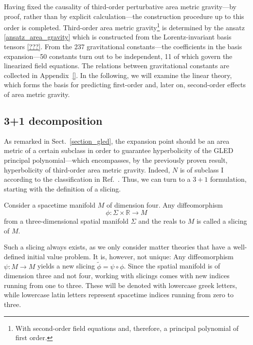 Having fixed the causality of third-order perturbative area metric gravity---by proof, rather than by explicit calculation---the construction procedure up to this order is completed. Third-order area metric gravity\footnote{With second-order field equations and, therefore, a principal polynomial of first order.} is determined by the ansatz \eqref{ansatz_area_gravity} which is constructed from the Lorentz-invariant basis tensors \eqref{???}. From the 237 gravitational constants---the coefficients in the basis expansion---50 constants turn out to be independent, 11 of which govern the linearized field equations. The relations between gravitational constants are collected in Appendix~\ref{}. In the following, we will examine the linear theory, which forms the basis for predicting first-order and, later on, second-order effects of area metric gravity.

\subsection{3+1 decomposition}
\label{sect_three_plus_one}
As remarked in Sect.~\ref{section_gled}, the expansion point should be an area metric of a certain subclass in order to guarantee hyperbolicity of the GLED principal polynomial---which encompasses, by the previously proven result, hyperbolicity of third-order area metric gravity. Indeed, $N$ is of subclass I according to the classification in Ref.~\cite{Schuller_2010}. Thus, we can turn to a $3+1$ formulation, starting with the definition of a slicing.
\begin{definition}[slicing]
  Consider a spacetime manifold $M$ of dimension four. Any diffeomorphism
  \begin{equation}
    \phi\colon \Sigma\times\mathbb R \rightarrow M
  \end{equation}
  from a three-dimensional spatial manifold $\Sigma$ and the reals to $M$ is called a slicing of $M$.
\end{definition}
Such a slicing always exists, as we only consider matter theories that have a well-defined initial value problem. It is, however, not unique: Any diffeomorphism $\psi\colon M\rightarrow M$ yields a new slicing $\tilde\phi = \psi\circ\phi$. Since the spatial manifold is of dimension three and not four, working with slicings comes with new indices running from one to three. These will be denoted with lowercase greek letters, while lowercase latin letters represent spacetime indices running from zero to three.

